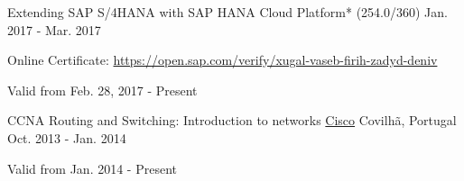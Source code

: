 \begin{cventries}
  \cventry
    {Extending SAP S/4HANA with SAP HANA Cloud Platform* (254.0/360)} %
    {} %
    {} %
    {Jan. 2017 - Mar. 2017} %
    {
	    \begin{cvitems} %
        \item {Online Certificate: \url{https://open.sap.com/verify/xugal-vaseb-firih-zadyd-deniv}} %
        \item {Valid from Feb. 28, 2017 - Present} %
      \end{cvitems}
    }
   
  \cventry
    {CCNA Routing and Switching: Introduction to networks} %
    {\href{https://www.cisco.com/}{Cisco}} %
    {Covilh\~a, Portugal} %
    {Oct. 2013 - Jan. 2014} %
    {
	    \begin{cvitems} %
        \item {Valid from Jan. 2014 - Present} %
      \end{cvitems}
    }

\end{cventries}